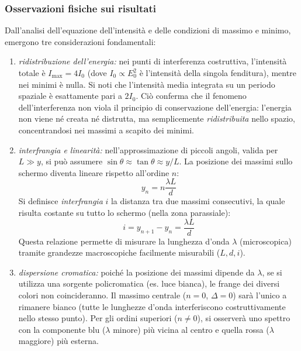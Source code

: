 \documentclass[a4paper,11pt]{report}
\begin{document}
\subsubsection*{Osservazioni fisiche sui risultati}
Dall'analisi dell'equazione dell'intensità e delle condizioni di massimo e minimo, emergono tre considerazioni fondamentali:

\begin{enumerate}
    \item \textit{ridistribuzione dell'energia:} nei punti di interferenza costruttiva, l'intensità totale è $I_{\text{max}} = 4I_0$ (dove $I_0 \propto E_0^2$ è l'intensità della singola fenditura), mentre nei minimi è nulla.
    Si noti che l'intensità media integrata su un periodo spaziale è esattamente pari a $2I_0$. Ciò conferma che il fenomeno dell'interferenza non viola il principio di conservazione dell'energia: l'energia non viene né creata né distrutta, ma semplicemente \textit{ridistribuita} nello spazio, concentrandosi nei massimi a scapito dei minimi.

    \item \textit{interfrangia e linearità:} nell'approssimazione di piccoli angoli, valida per $L \gg y$, si può assumere $\sin\theta \approx \tan\theta \approx y/L$. La posizione dei massimi sullo schermo diventa lineare rispetto all'ordine $n$:
    \begin{equation}
        y_n = n \frac{\lambda L}{d}
    \end{equation}
    Si definisce \textit{interfrangia} $i$ la distanza tra due massimi consecutivi, la quale risulta costante su tutto lo schermo (nella zona parassiale):
    \begin{equation}
        i = y_{n+1} - y_n = \frac{\lambda L}{d}
    \end{equation}
    Questa relazione permette di misurare la lunghezza d'onda $\lambda$ (microscopica) tramite grandezze macroscopiche facilmente misurabili ($L, d, i$).

    \item \textit{dispersione cromatica:} poiché la posizione dei massimi dipende da $\lambda$, se si utilizza una sorgente policromatica (es. luce bianca), le frange dei diversi colori non coincideranno.
    Il massimo centrale ($n=0$, $\Delta=0$) sarà l'unico a rimanere bianco (tutte le lunghezze d'onda interferiscono costruttivamente nello stesso punto). Per gli ordini superiori ($n \neq 0$), si osserverà uno spettro con la componente blu ($\lambda$ minore) più vicina al centro e quella rossa ($\lambda$ maggiore) più esterna.
\end{enumerate}
\end{document}
